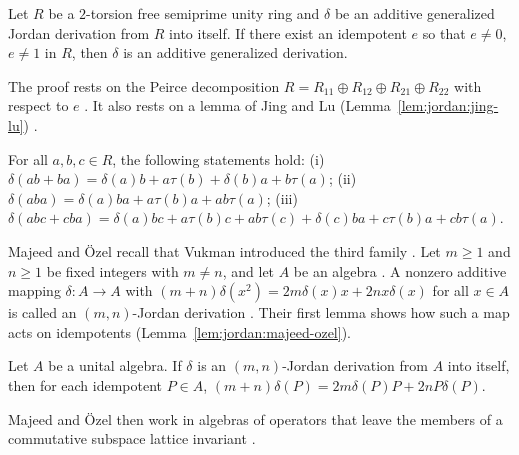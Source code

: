 \begin{theorem}\label{thm:jordan:ferreira-guzzo}
Let $R$ be a $2$-torsion free semiprime unity ring and $\delta$ be an additive generalized Jordan
derivation from $R$ into itself. If there exist an idempotent $e$ so that $e\neq0$, $e\neq1$ in $R$,
then $\delta$ is an additive generalized derivation.
\end{theorem}

The proof rests on the Peirce decomposition $R=R_{11}\oplus R_{12}\oplus R_{21}\oplus R_{22}$ with
respect to $e$ \cite[p.~2]{FerreiraGuzzoFerreira2020}. It also rests on a lemma of Jing and Lu (Lemma~\ref{lem:jordan:jing-lu})
\cite[p.~3]{FerreiraGuzzoFerreira2020}.\begin{lemma}\label{lem:jordan:jing-lu}
For all $a,b,c\in R$, the following statements hold:
(i) $\delta(ab+ba)=\delta(a)b+a\tau(b)+\delta(b)a+b\tau(a)$;
(ii) $\delta(aba)=\delta(a)ba+a\tau(b)a+ab\tau(a)$;
(iii) $\delta(abc+cba)=\delta(a)bc+a\tau(b)c+ab\tau(c)+\delta(c)ba+c\tau(b)a+cb\tau(a)$.
\end{lemma}

Majeed and Özel recall that Vukman introduced the third family
\cite[p.~1881]{MajeedOzel2014}. Let $m\geq1$ and $n\geq1$ be fixed integers
with $m\neq n$, and let $A$ be an algebra \cite[p.~1881]{MajeedOzel2014}. A
nonzero additive mapping $\delta\colon A\to A$ with
$(m+n)\delta(x^{2})=2m\delta(x)x+2nx\delta(x)$ for all $x\in A$ is called an
$(m,n)$-Jordan derivation \cite[p.~1881]{MajeedOzel2014}. Their first lemma
shows how such a map acts on idempotents (Lemma~\ref{lem:jordan:majeed-ozel}).

\begin{lemma}\label{lem:jordan:majeed-ozel}
Let $A$ be a unital algebra. If $\delta$ is an $(m,n)$-Jordan derivation from $A$ into itself, then
for each idempotent $P\in A$, $(m+n)\delta(P)=2m\delta(P)P+2nP\delta(P)$.
\end{lemma}

Majeed and Özel then work in algebras of operators that leave the members of a
commutative subspace lattice invariant \cite[p.~1881]{MajeedOzel2014}.

